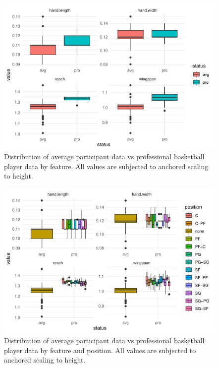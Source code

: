 \documentclass[]{article}
\begin{document}
\begin{figure}
\centering
\includegraphics{project-measure-writeup_files/figure-latex/image-proportion-comparison-1.pdf}
\caption{Distribution of average participant data vs professional
basketball player data by feature. All values are subjected to anchored
scaling to height.}
\end{figure}

\begin{figure}
\centering
\includegraphics{project-measure-writeup_files/figure-latex/appendix-boxplot-1.pdf}
\caption{Distribution of average participant data vs professional
basketball player data by feature and position. All values are subjected
to anchored scaling to height.}
\end{figure}
\end{document}
